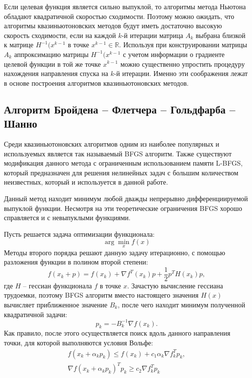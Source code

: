 Если целевая функция является сильно выпуклой, то алгоритмы метода Ньютона 
обладают квадратичной скоростью сходимости. Поэтому можно ожидать, что 
алгоритмы квазиньютоновских методов будут иметь достаточно высокую скорость 
сходимости, если на каждой \( k \)-й итерации матрица \( A_k \) выбрана 
близкой к матрице \( H^{-1}(x^{k-1} \) в точке \( x^{k-1} \in \mathbb{R} \). 
Используя при конструировании матрицы \( A_k \) аппроксимацию матрицы 
\( H^{-1}(x^{k-1} \) с учетом информации о градиенте целевой функции в той же 
точке \( x^{k-1} \) можно существенно упростить процедуру нахождения 
направления спуска на \( k \)-й итерации. Именно эти соображения лежат в 
основе построения алгоритмов квазиньютоновских методов.\cite{bib:methods}

\subsection{Алгоритм Бройдена -- Флетчера -- Гольдфарба -- Шанно}

Среди квазиньютоновских алгоритмов одним из наиболее популярных и используемых 
является так называемый BFGS алгоритм. Также существуют модификация данного 
метода с ограниченным использованием памяти L-BFGS, который предназначен для 
решения нелинейных задач с большим количеством неизвестных, который и 
используется в данной работе.

Данный метод находит минимум любой дважды непрерывно дифференциируемой 
выпуклой функции. Несмотря на эти теоретические ограничения BFGS хорошо 
справляется и с невыпуклыми функциями.

Пусть решается задача оптимизации функционала:
\[ 
    \arg\min_x f(x) 
\]
Методы второго порядка решают данную задачу итерационно, с помощью разложения 
функции в полином второй степени:
\[ 
    f(x_k + p) = f(x_k) + \nabla f^T(x_k) p + \frac{1}{2} p^T H(x_k) p, 
\]
где \( H \) -- гессиан функционала \( f \) в точке \( x \). Зачастую 
вычисление гессиана трудоемки, поэтому BFGS алгоритм вместо настоящего 
значения \( H(x) \) вычисляет приближенное значение \( B_k \), после чего 
находит минимум полученной квадратичной задачи:
\[ 
    p_k = - B_k^{-1}\nabla f(x_k). 
\]
Как правило, после этого осуществляется поиск вдоль данного направления точки, 
для которой выполняются условия Вольфе:
\begin{gather}
    f(x_k + \alpha_k p_k) \leq f(x_k) + c_1 \alpha_k \nabla f_k^T p_k, 
    \nonumber \\
    \nabla f(x_k + \alpha_k p_k)^T p_k \geq c_2 \nabla f_k^T p_k
    \label{eq:wolfe}
\end{gather}

